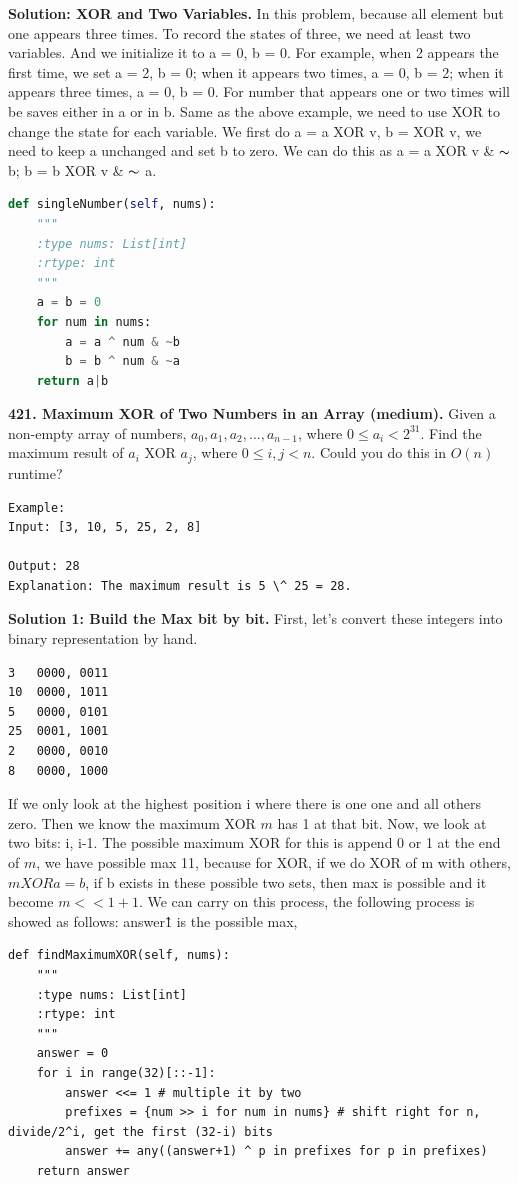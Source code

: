 \documentclass[../main.tex]{subfiles}
\begin{document}
\begin{examples}[resume]
\textbf{Solution: XOR and Two Variables.} In this problem, because all element but one appears three times. To record the states of three, we need at least two variables.  And we initialize it to a = 0, b = 0. For example, when 2 appears the first time, we set a = 2, b = 0; when it appears two times, a = 0, b = 2; when it appears three times, a = 0, b = 0. For number that appears one or two times will be saves either in a or in b. Same as the above example, we need to use XOR to change the state for each variable. We first do a = a XOR v, b = XOR v, we need to keep a unchanged and set b to zero. We can do this as a = a XOR v \& $\thicksim$  b; b = b XOR v \& $\thicksim$  a.
\begin{lstlisting}[language=Python]
def singleNumber(self, nums):
    """
    :type nums: List[int]
    :rtype: int
    """
    a = b = 0
    for num in nums:
        a = a ^ num & ~b
        b = b ^ num & ~a
    return a|b
\end{lstlisting}

\item \textbf{421. Maximum XOR of Two Numbers in an Array (medium).}  Given a non-empty array of numbers, $a_0, a_1, a_2,... , a_{n-1}$, where $0 \leq a_i < 2^{31}$. Find the maximum result of $a_i$ XOR $a_j$, where $0 \leq i, j < n$. Could you do this in $O(n)$ runtime?
\begin{lstlisting}[numbers=none]
Example:
Input: [3, 10, 5, 25, 2, 8]

Output: 28
Explanation: The maximum result is 5 \^ 25 = 28.
\end{lstlisting}
\textbf{Solution 1: Build the Max bit by bit.} First, let's convert these integers into binary representation by hand.
\begin{lstlisting}[numbers=none]
3   0000, 0011
10  0000, 1011
5   0000, 0101
25  0001, 1001
2   0000, 0010
8   0000, 1000
\end{lstlisting}
If we only look at the highest position i where there is one one and all others zero. Then we know the maximum XOR $m$ has 1 at that bit. Now, we look at two bits: i, i-1. The possible maximum XOR for this is append 0 or 1 at the end of $m$, we have possible max 11, because for XOR, if we do XOR of m with others,  $m XOR a = b$, if b exists in these possible two sets, then max is possible and it become  $m<<1+1$.  We can carry on this process,  the following process is showed as follows:
answer\^ 1 is the possible max,
\begin{lstlisting}
def findMaximumXOR(self, nums):
    """
    :type nums: List[int]
    :rtype: int
    """
    answer = 0
    for i in range(32)[::-1]:
        answer <<= 1 # multiple it by two
        prefixes = {num >> i for num in nums} # shift right for n, divide/2^i, get the first (32-i) bits
        answer += any((answer+1) ^ p in prefixes for p in prefixes)
    return answer
\end{lstlisting}


\end{examples}
\end{document}
